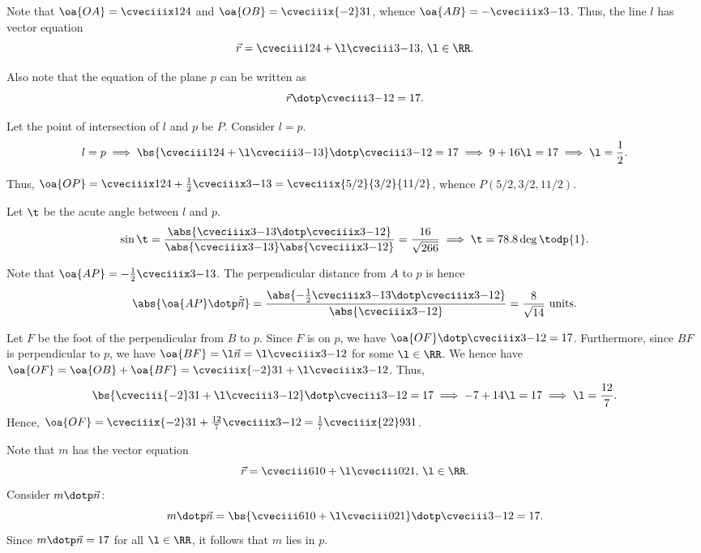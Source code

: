 \begin{solution}
    Note that $\oa{OA} = \cveciiix124$ and $\oa{OB} = \cveciiix{-2}31$, whence $\oa{AB} = -\cveciiix3{-1}3$. Thus, the line $l$ has vector equation \[\vec r = \cveciii124 + \l\cveciii3{-1}3, \, \l \in \RR.\]

    Also note that the equation of the plane $p$ can be written as \[\vec r \dotp \cveciii3{-1}2 = 17.\]

    \begin{ppart}
        Let the point of intersection of $l$ and $p$ be $P$. Consider $l = p$. \[l = p \implies \bs{\cveciii124 + \l\cveciii3{-1}3} \dotp \cveciii3{-1}2 = 17 \implies 9 + 16\l = 17 \implies \l = \frac12.\]

        Thus, $\oa{OP} = \cveciiix124 + \frac12\cveciiix3{-1}3 = \cveciiix{5/2}{3/2}{11/2}$, whence $P(5/2, 3/2, 11/2)$.

    \end{ppart}
    \begin{ppart}
        Let $\t$ be the acute angle between $l$ and $p$. \[\sin\t = \frac{\abs{\cveciiix3{-1}3 \dotp \cveciiix3{-1}2}}{\abs{\cveciiix3{-1}3} \abs{\cveciiix3{-1}2}} = \frac{16}{\sqrt{266}} \implies \t = 78.8 \deg \todp{1}.\]
    \end{ppart}
    \begin{ppart}
        Note that $\oa{AP} = -\frac12 \cveciiix3{-1}3$. The perpendicular distance from $A$ to $p$ is hence \[\abs{\oa{AP} \dotp \hat{\vec n}} = \frac{\abs{-\frac12\cveciiix3{-1}3 \dotp \cveciiix3{-1}2}}{\abs{\cveciiix3{-1}2}} = \frac8{\sqrt{14}} \text{ units}.\]
    \end{ppart}
    \begin{ppart}
        Let $F$ be the foot of the perpendicular from $B$ to $p$. Since $F$ is on $p$, we have $\oa{OF} \dotp \cveciiix3{-1}2 = 17$. Furthermore, since $BF$ is perpendicular to $p$, we have $\oa{BF} = \l \vec n = \l \cveciiix3{-1}2$ for some $\l \in \RR$. We hence have $\oa{OF} = \oa{OB} + \oa{BF} = \cveciiix{-2}31 + \l \cveciiix3{-1}2$. Thus, \[\bs{\cveciii{-2}31 + \l \cveciii3{-1}2} \dotp \cveciii3{-1}2 = 17 \implies -7 + 14\l = 17 \implies \l = \frac{12}7.\] Hence, $\oa{OF} = \cveciiix{-2}31 + \frac{12}7 \cveciiix3{-1}2 = \frac17\cveciiix{22}9{31}$.
    \end{ppart}
    \begin{ppart}
        Note that $m$ has the vector equation \[\vec r = \cveciii610 + \l \cveciii021, \, \l \in \RR.\] Consider $m \dotp \vec n$: \[ m \dotp \vec n = \bs{\cveciii610 + \l \cveciii021} \dotp \cveciii3{-1}2 = 17.\] Since $m \dotp \vec n = 17$ for all $\l \in \RR$, it follows that $m$ lies in $p$.
    \end{ppart}
\end{solution}

